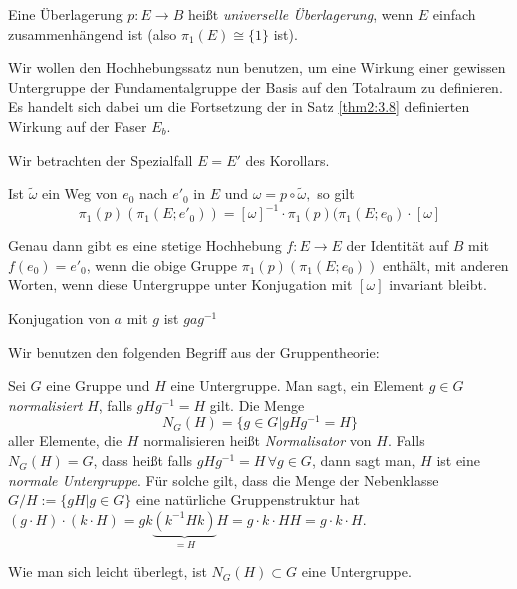 \documentclass[a4paper,10pt]{scrartcl}
\begin{document}
\begin{df}
 Eine Überlagerung $p:E\to B$ heißt \emph{universelle Überlagerung}, wenn $E$ einfach zusammenhängend ist (also $\pi_1(E)\cong \{1\}$ ist).
\end{df}
Wir wollen den Hochhebungssatz nun benutzen, um eine Wirkung einer gewissen Untergruppe der Fundamentalgruppe der Basis auf den Totalraum zu definieren. Es handelt sich dabei um die Fortsetzung der in Satz \ref{thm2:3.8} definierten Wirkung auf der Faser $E_b$.

Wir betrachten der Spezialfall $E=E'$ des Korollars. 
\begin{figure}[H]
\centering
 
\end{figure}

Ist $\tilde \omega$ ein Weg von  $e_0$ nach $e'_0$ in $E$ und $\omega=p\circ \tilde \omega,$ so gilt
\[
 \pi_1(p)(\pi_1(E;e'_0))=[\omega]^{-1}\cdot \pi_1(p)(\pi_1(E;e_0)\cdot [\omega]
\]

\begin{figure}[H]
\centering
 \fixme[fig91]
\caption{}
\end{figure}
Genau dann gibt es eine stetige Hochhebung $f:E\to E$ der Identität auf $B$ mit $f(e_0)=e'_0$, wenn die obige Gruppe $\pi_1(p)(\pi_1(E;e_0))$ enthält, mit anderen Worten, wenn diese Untergruppe unter Konjugation mit $[\omega]$ invariant bleibt.

\begin{note*}
Konjugation von $a$ mit $g$ ist $gag^{-1}$
\end{note*}

Wir benutzen den folgenden Begriff aus der Gruppentheorie:

Sei $G$ eine Gruppe und $H$ eine Untergruppe. Man sagt, ein Element $g\in G$ \emph{normalisiert} $H$, falls $gHg^{-1}=H$ gilt. Die Menge 
\[
 N_G(H)=\{g\in G| gHg^{-1}=H\}
\]
aller Elemente, die $H$ normalisieren heißt \emph{Normalisator} von $H$. Falls $N_G(H)=G$, dass heißt falls $gHg^{-1}=H \, \forall g\in G$, dann sagt man, $H$ ist eine \emph{normale Untergruppe}. Für solche gilt, dass die Menge der Nebenklasse $G/H:=\{gH|g\in G\}$ eine natürliche Gruppenstruktur hat $(g\cdot H)\cdot (k\cdot H)=g k \underbrace{(k^{-1}Hk)}_{=H}H=g\cdot k \cdot HH=g\cdot k \cdot H$.

Wie man sich leicht überlegt, ist $N_G(H)\subset G$ eine Untergruppe.  
\end{document}

